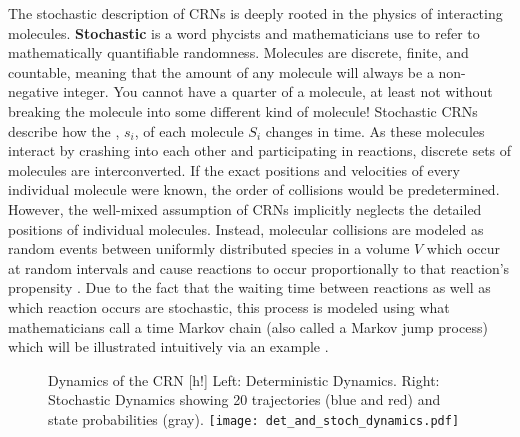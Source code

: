The stochastic description of CRNs is deeply rooted in the physics of interacting molecules. \textbf{Stochastic} is a word phycists and mathematicians use to refer to mathematically quantifiable randomness. Molecules are discrete, finite, and countable, meaning that the amount of any molecule will always be a non-negative integer. You cannot have a quarter of a molecule, at least not without breaking the molecule into some different kind of molecule! Stochastic CRNs describe how the , $s_i$, of each molecule $S_i$ changes in time. As these molecules interact by crashing into each other and participating in reactions, discrete sets of molecules are interconverted. If the exact positions and velocities of every individual molecule were known, the order of collisions would be predetermined. However, the well-mixed assumption of CRNs implicitly neglects the detailed positions of individual molecules. Instead, molecular collisions are modeled as random events between uniformly distributed species in a volume $V$ which occur at random intervals and cause reactions to occur proportionally to that reaction's propensity \cite{}. Due to the fact that the waiting time between reactions as well as which reaction occurs are stochastic, this process is modeled using what mathematicians call a time Markov chain (also called a Markov jump process) which will be illustrated intuitively via an example \cite{}.  

\begin{figure}[label=fig:crn:det-and-stoch-dynamics,credit={Image Credit: William Poole}]{%
    Dynamics of the CRN [h!]
    Left: Deterministic Dynamics.
    Right: Stochastic Dynamics showing 20 trajectories (blue and red) and state probabilities (gray).}
  \texttt{[image: det\_and\_stoch\_dynamics.pdf]}
\end{figure}

